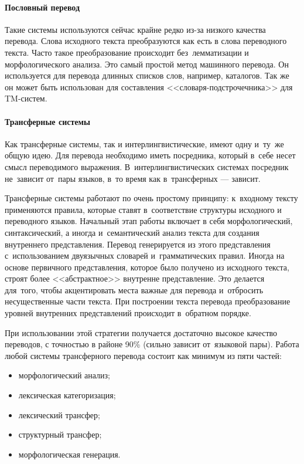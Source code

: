\paragraph{Пословный перевод}
Такие системы используются сейчас крайне редко из-за низкого качества перевода. 
Слова исходного текста преобразуются как есть в слова переводного текста. 
Часто такое преобразование происходит без~лемматизации и морфологического анализа. 
Это самый простой метод машинного перевода. 
Он используется для перевода длинных списков слов, например, каталогов. 
Так же он может быть использован 
для составления <<словаря-подстрочечника>> для TM-систем.

\paragraph{Трансферные системы}
Как трансферные системы, так и интерлингвистические, 
имеют одну и~ту~же общую идею. 
Для перевода необходимо иметь посредника, 
который в~себе несет смысл переводимого выражения. 
В~интерлингвистических системах посредник 
не~зависит от~пары языков, в~то время как в~трансферных --- зависит. 

Трансферные системы работают по очень простому принципу: 
к~входному тексту применяются правила, которые ставят 
в~соответствие структуры исходного и переводного языков. 
Начальный этап работы включает в себя морфологический, 
синтаксический, а иногда и~семантический анализ 
текста для создания внутреннего представления. 
Перевод генерируется из этого представления 
с~использованием двуязычных словарей и~грамматических правил. 
Иногда на основе первичного представления, 
которое было  получено из исходного текста, 
строят более <<абстрактное>> внутренне представление. 
Это делается для~того, чтобы акцентировать места важные для перевода 
и~отбросить несущественные части текста. 
При построении текста перевода преобразование уровней внутренних 
представлений происходит в~обратном порядке.

При использовании этой стратегии получается достаточно 
высокое качество переводов, 
с точностью в районе 90\% (сильно зависит от~языковой пары). 
Работа любой системы трансферного перевода состоит как минимум из пяти частей:
\begin{itemize}
	\item  морфологический анализ;
	\item  лексическая категоризация;
	\item  лексический трансфер;
	\item  структурный трансфер;
	\item  морфологическая генерация.
\end{itemize}

